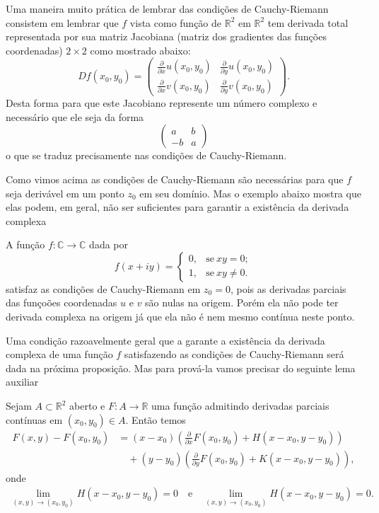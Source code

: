 Uma maneira muito prática de lembrar das condições de Cauchy-Riemann consistem em lembrar que 
$f$ vista como função de $\mathbb{R}^2$ em $\mathbb{R}^2$ tem derivada total representada
por sua matriz Jacobiana (matriz dos gradientes das funções coordenadas) $2\times 2$ como mostrado abaixo:
\[
Df(x_0,y_0)
=
\begin{pmatrix}
\displaystyle \frac{\partial}{\partial x}u(x_0,y_0) & \displaystyle \frac{\partial}{\partial y} u(x_0,y_0)
\\[0.5cm] 
\displaystyle \frac{\partial}{\partial x}v(x_0,y_0) & \displaystyle \frac{\partial}{\partial y} v(x_0,y_0)
\end{pmatrix}.
\]
Desta forma para que este Jacobiano represente um número complexo e necessário que ele seja da forma 
\[
\begin{pmatrix}
a&b\\
-b&a
\end{pmatrix}
\]
o que se traduz precisamente nas condições de Cauchy-Riemann.

\bigskip 

Como vimos acima as condições de Cauchy-Riemann são necessárias para que $f$ seja derivável em um 
ponto $z_0$ em seu domínio. Mas o exemplo abaixo mostra que elas podem, em geral, não ser suficientes
para garantir a existência da derivada complexa

\begin{exemplo}
A função $f:\mathbb{C}\to\mathbb{C}$ dada por 
\[
f(x+iy)
=
\begin{cases}
0,& \text{se}\ xy=0;
\\
1,& \text{se}\ xy\neq 0.
\end{cases}
\]
satisfaz as condições de Cauchy-Riemann em $z_0=0$, pois as derivadas parciais das funçoões coordenadas $u$ e $v$
são nulas na origem. Porém ela não pode ter derivada complexa na origem
já que ela não é nem mesmo contínua neste ponto.
\end{exemplo}

Uma condição razoavelmente geral que a garante a existência da derivada complexa de uma função $f$
satisfazendo as condições de Cauchy-Riemann será dada na próxima proposição. Mas para prová-la
vamos precisar do seguinte lema auxiliar

\begin{lema}\label{lema-aux-reciproca-CR}
Sejam $A\subset\mathbb{R}^2$ aberto e $F:A\to\mathbb{R}$ uma função admitindo derivadas parciais contínuas 
em $(x_0,y_0)\in A$. Então temos 
\begin{align}\label{eq-aux1-lema-aux-reciproca-CR}
F(x,y)-F(x_0,y_0)
&=
(x-x_0)\left(  \frac{\partial }{\partial x}F(x_0,y_0) +H(x-x_0,y-y_0) \right)
\\
&\quad +
(y-y_0)\left(  \frac{\partial }{\partial y}F(x_0,y_0) +K(x-x_0,y-y_0) \right),
\end{align}
onde 
\begin{align*}
\lim_{(x,y)\to (x_0,y_0)} H(x-x_0,y-y_0)=0
\quad\text{e}\quad
\lim_{(x,y)\to (x_0,y_0)} H(x-x_0,y-y_0)=0.
\end{align*}
\end{lema}

